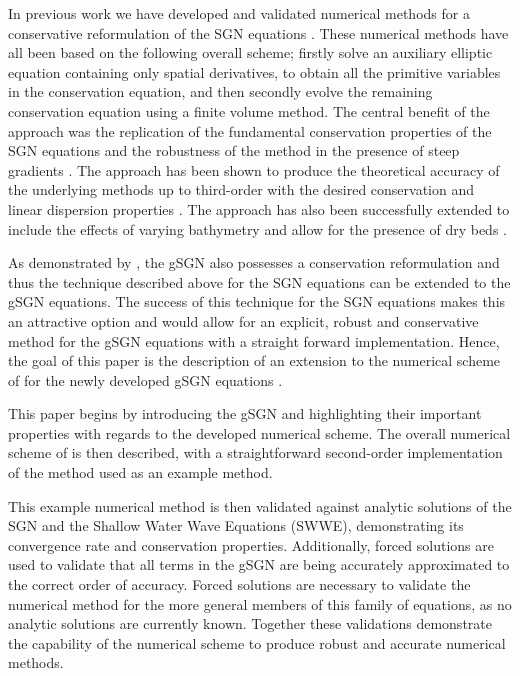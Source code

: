 \documentclass[10pt]{elsarticle}
\begin{document}
In previous work we have developed and validated numerical methods for a conservative reformulation of the SGN equations \cite{Zoppou-2014,Zoppou-etal-2016,Zoppou-etal-2017,Pitt-2019}. These numerical methods have all been based on the following overall scheme; firstly solve an auxiliary elliptic equation containing only spatial derivatives, to obtain all the primitive variables in the conservation equation, and then secondly evolve the remaining conservation equation using a finite volume method. The central benefit of the approach was the replication of the fundamental conservation properties of the SGN equations \cite{Pitt-2019} and the robustness of the method in the presence of steep gradients \cite{Pitt-2018-61}. The approach has been shown to produce the theoretical accuracy of the underlying methods up to third-order \cite{Zoppou-etal-2017,Pitt-2019} with the desired conservation and linear dispersion properties \cite{Pitt-2019}. The approach has also been successfully extended to include the effects of varying bathymetry and allow for the presence of dry beds \cite{Pitt-2019}.  

As demonstrated by \citet{Clamond-Dutykh-2018-237}, the gSGN also possesses a conservation reformulation and thus the technique described above for the SGN equations \cite{Zoppou-2014,Zoppou-etal-2016,Zoppou-etal-2017,Pitt-2019} can be extended to the gSGN equations. The success of this technique for the SGN equations makes this an attractive option and would allow for an explicit, robust and conservative method for the gSGN equations with a straight forward implementation. Hence, the goal of this paper is the description of an extension to the numerical scheme of \citet{Zoppou-etal-2017} for the newly developed gSGN equations \cite{Clamond-Dutykh-2018-237}. 

This paper begins by introducing the gSGN and highlighting their important properties with regards to the developed numerical scheme. The overall numerical scheme of \citet{Zoppou-etal-2017} is then described, with a straightforward second-order implementation of the method used as an example method. 

This example numerical method is then validated against analytic solutions of the SGN and the Shallow Water Wave Equations (SWWE), demonstrating its convergence rate and conservation properties. Additionally, forced solutions are used to validate that all terms in the gSGN are being accurately approximated to the correct order of accuracy. Forced solutions are necessary to validate the numerical method for the more general members of this family of equations, as no analytic solutions are currently known. Together these validations demonstrate the capability of the numerical scheme to produce robust and accurate numerical methods. 
\end{document}
